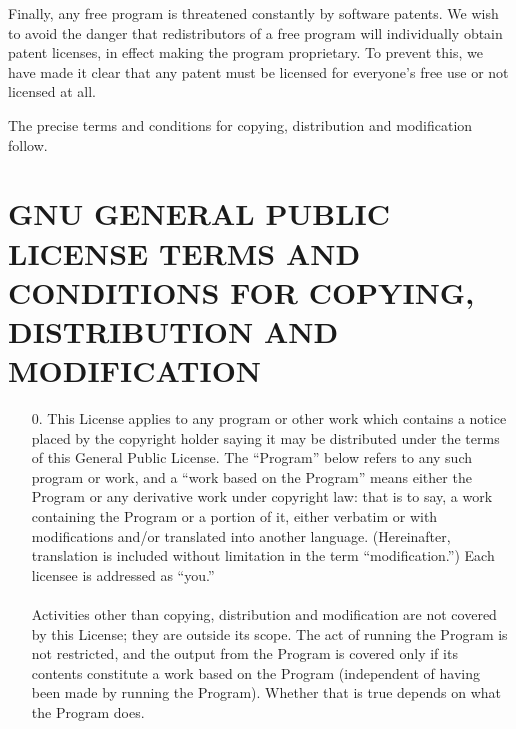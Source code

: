 \documentclass[oneside,english]{book}
\begin{document}
Finally, any free program is threatened constantly by software patents.
We wish to avoid the danger that redistributors of a free program
will individually obtain patent licenses, in effect making the program
proprietary. To prevent this, we have made it clear that any patent
must be licensed for everyone's free use or not licensed at all.

The precise terms and conditions for copying, distribution and modification
follow.


\section*{GNU GENERAL PUBLIC LICENSE TERMS AND CONDITIONS FOR COPYING, DISTRIBUTION
AND MODIFICATION }

\begin{itemize}

\item[0.]This License applies to any program or other work which
contains a notice placed by the copyright holder saying it may be
distributed under the terms of this General Public License. The ``Program''
below refers to any such program or work, and a ``work based on the
Program'' means either the Program or any derivative work under copyright
law: that is to say, a work containing the Program or a portion of
it, either verbatim or with modifications and/or translated into another
language. (Hereinafter, translation is included without limitation
in the term ``modification.'') Each licensee is addressed as ``you.''\\
\\
Activities other than copying, distribution and modification are not
covered by this License; they are outside its scope. The act of running
the Program is not restricted, and the output from the Program is
covered only if its contents constitute a work based on the Program
(independent of having been made by running the Program). Whether
that is true depends on what the Program does.

\end{itemize}
\end{document}
